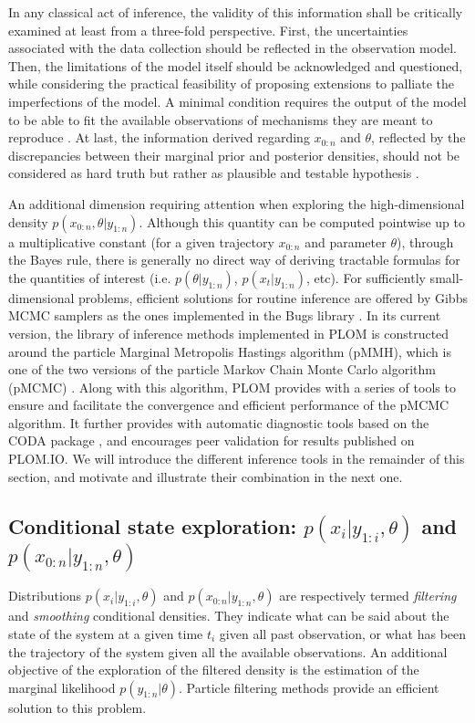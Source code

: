 \documentclass[a4paper,11pt]{article}
\begin{document}
In any classical act of inference, the validity of this information shall be critically examined at least from a three-fold perspective. First, the uncertainties associated with the data collection should be reflected in the observation model. Then, the limitations of the model itself should be acknowledged and questioned, while considering the practical feasibility of  proposing extensions to palliate the imperfections of the model. A minimal condition requires the output of the model to be able to fit the available observations of mechanisms they are meant to reproduce \citep{Gelman2012}. At last, the information derived regarding $x_{0:n}$  and  $\theta$, reflected by the discrepancies between their marginal prior and posterior densities, should not be considered as hard truth but rather as plausible and testable hypothesis  \citep{Popper2002}. 


An additional dimension requiring attention when exploring the high-dimensional density $p(x_{0:n},\theta|y_{1:n})$. Although this quantity can  be computed pointwise  up to a multiplicative constant (for a given trajectory $x_{0:n}$ and parameter $\theta$), through the Bayes rule, there is generally no direct way of deriving tractable formulas for the quantities of interest (i.e. $p(\theta|y_{1:n})$, $p(x_t|y_{1:n})$, etc). For sufficiently small-dimensional problems, efficient solutions for routine inference are offered by Gibbs MCMC samplers as the ones implemented in the Bugs library \citep{Lunn2000}. In its current version, the library of inference methods implemented in PLOM is constructed around the particle Marginal Metropolis Hastings algorithm (pMMH), which is one of the two versions of the particle Markov Chain Monte Carlo algorithm (pMCMC) \citep{Andrieu2010}. Along with this algorithm, PLOM provides with a series of tools to ensure and facilitate  the convergence and efficient  performance of the pMCMC algorithm. It further provides with automatic diagnostic tools based on the CODA package \citep{Plummer2006}, and encourages peer validation for  results published on PLOM.IO. We will introduce the different inference tools in the remainder of this section, and motivate and illustrate their combination in the next one.


\subsection{Conditional state exploration: $p(x_i|y_{1:i},\theta)$ and  $p(x_{0:n}|y_{1:n},\theta)$}

Distributions $p(x_i|y_{1:i},\theta)$ and  $p(x_{0:n}|y_{1:n},\theta)$ are respectively termed \emph{filtering} and \emph{smoothing} conditional densities. They indicate what  can be said about the state of the system at a given time $t_i$ given all past observation, or what has been the trajectory of the system given all the available observations. An additional objective of the exploration of the filtered density is the estimation of the marginal likelihood $p(y_{1:n}|\theta)$. Particle filtering methods provide an efficient solution to this problem.
\end{document}
